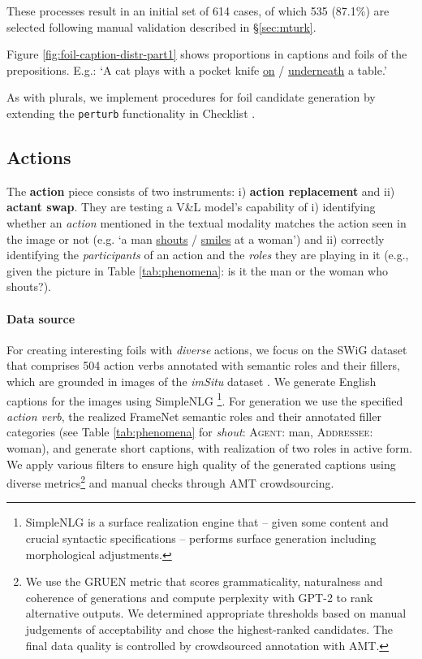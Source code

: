 \documentclass[11pt]{article}
\newcommand{\gr}[1]{\textcolor{niceblue}{#1}}
\newcommand\red[1]{\textcolor{niceorange}{#1}}
\begin{document}
These processes result in an initial set of 614 cases, of which 535 (87.1\%) are selected following manual validation described in \S \ref{sec:mturk}. 

Figure \ref{fig:foil-caption-distr-part1} shows proportions in captions and foils of the prepositions. E.g.: `A cat plays with a pocket knife \gr{\underline{on}} / \red{\underline{underneath}} a table.'

As with plurals, we implement procedures for foil candidate generation by extending the \texttt{perturb} functionality in Checklist \cite{ribeiro-etal-2020-beyond}.

\subsection{Actions}\label{app:actions}
The \textbf{action} piece consists of two instruments: i) \textbf{action replacement} and ii) \textbf{actant swap}.
They are testing a V\&L model's capability of i) identifying whether an \textit{action} mentioned in the textual modality matches the action seen in the image or not (e.g. `a man \gr{\underline{shouts}} / \red{\underline{smiles}} at a woman') 
and ii) correctly identifying the \textit{participants} of an action and the \textit{roles} they are playing in it (e.g., given the picture in Table \ref{tab:phenomena}: is it the man or the woman who shouts?).




\paragraph{Data source}
For creating interesting foils with \emph{diverse} actions, we focus on the SWiG dataset \cite{DBLP:conf/eccv/PrattYWFK20} that comprises 504 action verbs annotated with semantic roles and their fillers, which are grounded in images of the \textit{imSitu} dataset \cite{Yatskar_2016_CVPR}. We generate English captions for the images 
using SimpleNLG \cite{gatt-reiter-2009-simplenlg}\footnote{SimpleNLG is a surface realization engine that -- given some content and crucial syntactic specifications -- performs surface generation including  morphological adjustments.}. For generation we use the specified \textit{action verb}, the  realized FrameNet semantic roles and their annotated filler categories (see Table \ref{tab:phenomena} for \textit{shout}: \textsc{Agent}: man, \textsc{Addressee}: woman), and generate short captions, with realization of  two roles in active form.
We apply various filters to ensure high quality of the generated captions using diverse metrics\footnote{We use the GRUEN metric \citep{zhu-bhat-2020-gruen} that scores grammaticality, naturalness and coherence of generations and compute perplexity with GPT-2 to rank alternative outputs. We determined appropriate  thresholds based on manual judgements of acceptability and chose the highest-ranked candidates. The final data quality is controlled by crowdsourced annotation with AMT.} and manual checks through AMT crowdsourcing.
\end{document}
